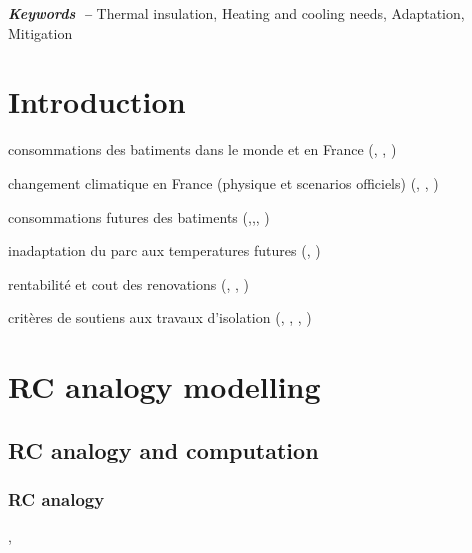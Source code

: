 \documentclass[11pt]{article}
\providecommand{\keywords}[1]
{
  \small    
  \textbf{\textit{Keywords~--}} #1
}
\begin{document}
\keywords{Thermal insulation, Heating and cooling needs, Adaptation, Mitigation}

\clearpage
\tableofcontents

\clearpage

\section{Introduction}
\label{sec:intro}

consommations des batiments dans le monde et en France (\cite{unep_2023_2024}, \cite{sdes_chiffres_2023}, \cite{sdes_consommation_2023})

changement climatique en France (physique et scenarios officiels) (\cite{ipcc_climate_2021}, \cite{ouzeau_heat_2016}, \cite{ministere_de_la_transition_ecologique_trajectoire_2023})

consommations futures des batiments (\cite{larsen_climate_2020},\cite{moreau_evaluation_2023},\cite{filahi_projections_2024}, \cite{tao_uncertainty_2024})

inadaptation du parc aux temperatures futures (\cite{cour_des_comptes_laction_2024}, \cite{i4ce_vagues_2024})

rentabilité et cout des renovations (\cite{ademe_renovation_2019}, \cite{i4ce_trajectoires_2023}, \cite{giraudet_analyse_2024})

critères de soutiens aux travaux d'isolation (\cite{france_strategie_dispositif_2024}, \cite{coulaud_maprimerenov_2024}, \cite{anah_aides_2024-1}, \cite{dagostino_impact_2024})

\clearpage
\section{RC analogy modelling}
\label{sec:rc}

    \subsection{RC analogy and computation} %
    \label{sub:rc_analogy_and_computation}

        \subsubsection{RC analogy} %
        \label{ssub:rc_analogy}


        \cite{fourier_theorie_1822}, \cite{bolmont_evolution_2003}
        
\end{document}
